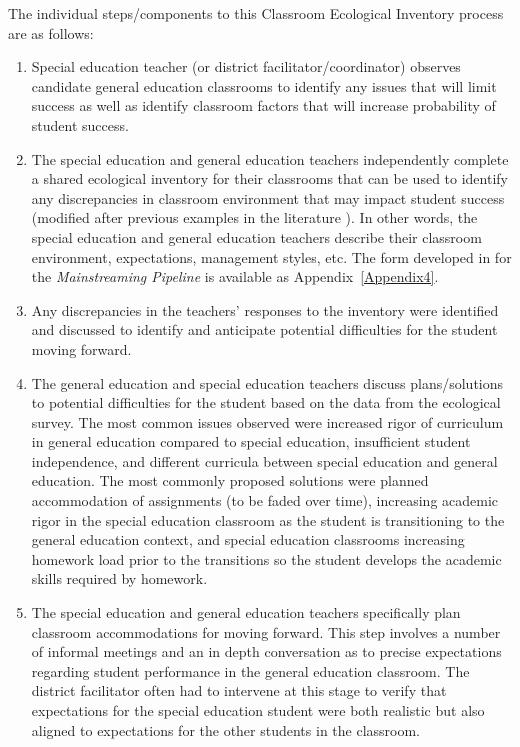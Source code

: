 \documentclass[twoside]{article}
\begin{document}
The individual steps/components to this Classroom Ecological Inventory process are as follows: 
\begin{enumerate}
\item Special education teacher (or district facilitator/coordinator) observes candidate general education classrooms to identify any issues that will limit success as well as identify classroom factors that will increase probability of student success. 

\item The special education and general education teachers independently complete a shared ecological inventory for their classrooms that can be used to identify any discrepancies in classroom environment that may impact student success (modified after previous examples in the literature \cite{fuchs1994classroom,marden2013criteria}). In other words, the special education and general education teachers describe their classroom environment, expectations, management styles, etc. The form developed in for the \textit{Mainstreaming Pipeline} is available as Appendix~\ref{Appendix4}.

\item Any discrepancies in the teachers' responses to the inventory were identified and discussed to identify and anticipate potential difficulties for the student moving forward.

\item The general education and special education teachers discuss plans/solutions to potential difficulties for the student based on the data from the ecological survey. The most common issues observed were increased rigor of curriculum in general education compared to special education, insufficient student independence, and different curricula between special education and general education. The most commonly proposed solutions were planned accommodation of assignments (to be faded over time), increasing academic rigor in the special education classroom as the student is transitioning to the general education context, and special education classrooms increasing homework load prior to the transitions so the student develops the academic skills required by homework. 

\item The special education and general education teachers specifically plan classroom accommodations for moving forward. This step involves a number of informal meetings and an in depth conversation as to precise expectations regarding student performance in the general education classroom. The district facilitator often had to intervene at this stage to verify that expectations for the special education student were both realistic but also aligned to expectations for the other students in the classroom. 
\end{enumerate}
\end{document}
